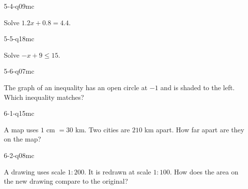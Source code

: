 \begin{practiceQuestion}{5-4-q09}{mc}
\begin{questionText}
Solve $1.2x + 0.8 = 4.4$.
\end{questionText}
\end{practiceQuestion}

\begin{practiceQuestion}{5-5-q18}{mc}
\begin{questionText}
Solve $-x + 9 \leq 15$.
\end{questionText}
\end{practiceQuestion}

\begin{practiceQuestion}{5-6-q07}{mc}
\begin{questionText}
The graph of an inequality has an open circle at $-1$ and is shaded to the left. Which inequality matches?
\end{questionText}
\end{practiceQuestion}

\begin{practiceQuestion}{6-1-q15}{mc}
\begin{questionText}
A map uses $1$ cm $= 30$ km. Two cities are $210$ km apart. How far apart are they on the map?
\end{questionText}
\end{practiceQuestion}

\begin{practiceQuestion}{6-2-q08}{mc}
\begin{questionText}
A drawing uses scale $1:200$. It is redrawn at scale $1:100$. How does the area on the new drawing compare to the original?
\end{questionText}
\end{practiceQuestion}

